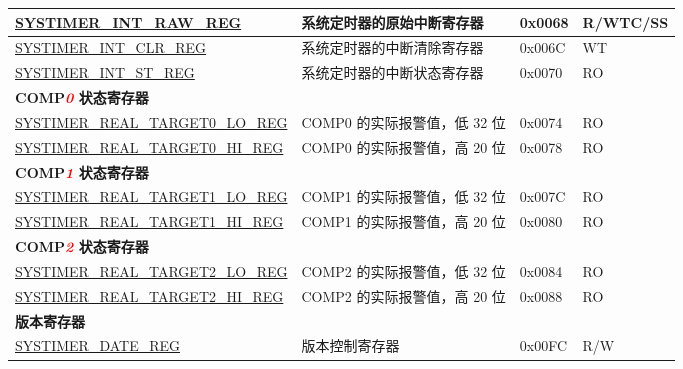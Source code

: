 \begin{longtable}{ | p{6cm} | p{7.2cm} | p{1.3cm} | p{1cm} | }
\hyperref[regdesc:SYSTIMERINTRAWREG]{SYSTIMER\_INT\_RAW\_REG} & 系统定时器的原始中断寄存器 & 0x0068 & R/WTC/SS \\ \hline
\hyperref[regdesc:SYSTIMERINTCLRREG]{SYSTIMER\_INT\_CLR\_REG} & 系统定时器的中断清除寄存器 & 0x006C & WT \\ \hline
\hyperref[regdesc:SYSTIMERINTSTREG]{SYSTIMER\_INT\_ST\_REG} & 系统定时器的中断状态寄存器 & 0x0070 & RO \\ \hline
\multicolumn{4}{|l|}{\textbf{COMP\textcolor{red}{\it{0}} 状态寄存器}} \\ \hline
\hyperref[regdesc:SYSTIMERREALTARGET0LOREG]{SYSTIMER\_REAL\_TARGET0\_LO\_REG} & COMP0 的实际报警值，低 32 位 & 0x0074 & RO \\ \hline
\hyperref[regdesc:SYSTIMERREALTARGET0HIREG]{SYSTIMER\_REAL\_TARGET0\_HI\_REG} & COMP0 的实际报警值，高 20 位 & 0x0078 & RO \\ \hline
\multicolumn{4}{|l|}{\textbf{COMP\textcolor{red}{\it{1}} 状态寄存器}} \\ \hline
\hyperref[regdesc:SYSTIMERREALTARGET1LOREG]{SYSTIMER\_REAL\_TARGET1\_LO\_REG} & COMP1 的实际报警值，低 32 位 & 0x007C & RO \\ \hline
\hyperref[regdesc:SYSTIMERREALTARGET1HIREG]{SYSTIMER\_REAL\_TARGET1\_HI\_REG} & COMP1 的实际报警值，高 20 位 & 0x0080 & RO \\ \hline
\multicolumn{4}{|l|}{\textbf{COMP\textcolor{red}{\it{2}} 状态寄存器}} \\ \hline
\hyperref[regdesc:SYSTIMERREALTARGET2LOREG]{SYSTIMER\_REAL\_TARGET2\_LO\_REG} & COMP2 的实际报警值，低 32 位 & 0x0084 & RO \\ \hline
\hyperref[regdesc:SYSTIMERREALTARGET2HIREG]{SYSTIMER\_REAL\_TARGET2\_HI\_REG} & COMP2 的实际报警值，高 20 位 & 0x0088 & RO \\ \hline
\multicolumn{4}{|l|}{\textbf{版本寄存器}} \\ \hline
\hyperref[regdesc:SYSTIMERDATEREG]{SYSTIMER\_DATE\_REG} & 版本控制寄存器 & 0x00FC & R/W \\ \hline
\end{longtable}
